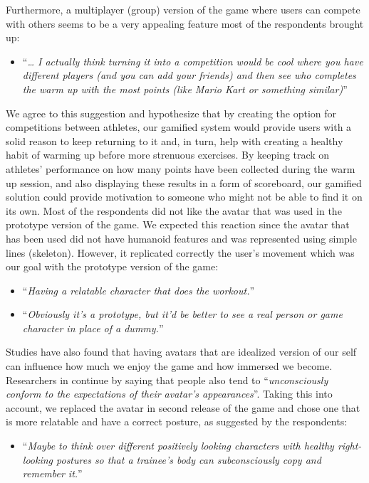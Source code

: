 Furthermore, a multiplayer (group) version of the game where users can compete with others seems to be a very appealing feature most of the respondents brought up: 
\begin{itemize}
\item ``\textit{… I actually think turning it into a competition would be cool where you have different players (and you can add your friends) and then see who completes the warm up with the most points (like Mario Kart or something similar)}''
\end{itemize}
We agree to this suggestion and hypothesize that by creating the option for competitions between athletes, our gamified system would provide users with a solid reason to keep returning to it and, in turn, help with creating a healthy habit of warming up before more strenuous exercises. By keeping track on athletes' performance on how many points have been collected during the warm up session, and also displaying these results in a form of scoreboard, our gamified solution could provide motivation to someone who might not be able to find it on its own.
Most of the respondents did not like the avatar that was used in the prototype version of the game. We expected this reaction since the avatar that has been used did not have humanoid features and was represented using simple lines (skeleton). However, it replicated correctly the user's movement which was our goal with the prototype version of the game: 
\begin{itemize}
\item ``\textit{Having a relatable character that does the workout.}''
\item ``\textit{Obviously it's a prototype, but it'd be better to see a real person or game character in place of a dummy.}''
\end{itemize}
Studies have also found that having avatars that are idealized version of our self can influence how much we enjoy the game and how immersed we become. Researchers in \cite{avatar} continue by saying that people also tend to ``\textit{unconsciously conform to the expectations of their avatar's appearances}''. Taking this into account, we replaced the avatar in second release of the game and chose one that is more relatable and have a correct posture, as suggested by the respondents: 
\begin{itemize}
\item ``\textit{Maybe to think over different positively looking characters with healthy right-looking postures so that a trainee's body can subconsciously copy and remember it.}''
\end{itemize}
